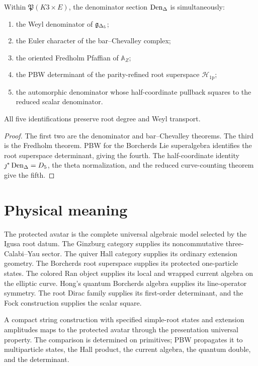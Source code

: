 \begin{theorem}
Within $\mathfrak P(K3\times E)$, the denominator section $\operatorname{Den}_{\Delta}$ is simultaneously:
\begin{enumerate}
\item the Weyl denominator of ${\mathfrak g_{\Delta_5}}$;
\item the Euler character of the bar--Chevalley complex;
\item the oriented Fredholm Pfaffian of $\mathbb A_Z$;
\item the PBW determinant of the parity-refined root superspace $\mathcal H_{\mathrm{1p}}$;
\item the automorphic denominator whose half-coordinate pullback squares to the reduced scalar denominator.
\end{enumerate}
All five identifications preserve root degree and Weyl transport.
\end{theorem}
\begin{proof}
The first two are the denominator and bar--Chevalley theorems.  The third is the Fredholm theorem.  PBW for the Borcherds Lie superalgebra identifies the root superspace determinant, giving the fourth.  The half-coordinate identity $\jmath^*\operatorname{Den}_{\Delta}=D_5$, the theta normalization, and the reduced curve-counting theorem give the fifth.
\end{proof}

\chapter{Physical meaning}
The protected avatar is the complete universal algebraic model selected by the Igusa root datum.  The Ginzburg category supplies its noncommutative three-Calabi--Yau sector.  The quiver Hall category supplies its ordinary extension geometry.  The Borcherds root superspace supplies its protected one-particle states.  The colored Ran object supplies its local and wrapped current algebra on the elliptic curve.  Hong's quantum Borcherds algebra supplies its line-operator symmetry.  The root Dirac family supplies its first-order determinant, and the Fock construction supplies the scalar square.

A compact string construction with specified simple-root states and extension amplitudes maps to the protected avatar through the presentation universal property.  The comparison is determined on primitives; PBW propagates it to multiparticle states, the Hall product, the current algebra, the quantum double, and the determinant.

